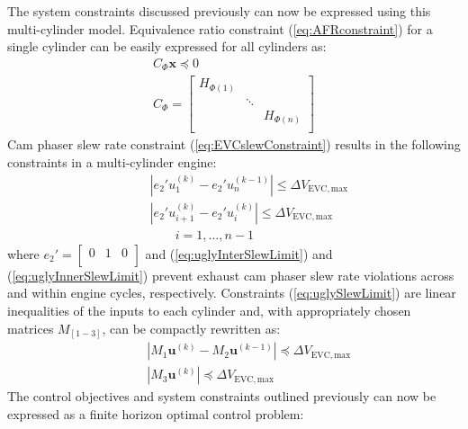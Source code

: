 The system constraints discussed previously can now be expressed using this multi-cylinder model. Equivalence ratio constraint (\ref{eq:AFRconstraint}) for a single cylinder can be easily expressed for all cylinders as:
\begin{gather}
C_{\Phi} \mathbf x \preceq 0 \\[2ex]
C_{\Phi} =
\begin{bmatrix}
H_{\Phi(1)} & &   \\
 & \ddots & \\
 & & H_{\Phi(n)} \nonumber \\
\end{bmatrix}
\end{gather}
Cam phaser slew rate constraint (\ref{eq:EVCslewConstraint}) results in the following constraints in a multi-cylinder engine:
\begin{subequations}
\label{eq:uglySlewLimit}
\begin{alignat}{2}
&&&\left|e_2' u_1^{(k)} - e_2' u_n^{(k-1)}\right| \leq \Delta V_{\mathrm{EVC,max}} \label{eq:uglyInterSlewLimit}\\
&&&\left|e_2' u_{i+1}^{(k)} - e_2' u_i^{(k)}\right| \leq \Delta V_{\mathrm{EVC,max}} \label{eq:uglyInnerSlewLimit}\\
&&& \qquad i=1,\ldots,n-1  \nonumber
\end{alignat}
\end{subequations}
where $e_2'= \left[\begin{array}{ccc}0 & 1 & 0 \\\end{array}\right]$ and (\ref{eq:uglyInterSlewLimit}) and (\ref{eq:uglyInnerSlewLimit}) prevent exhaust cam phaser slew rate violations across and within engine cycles, respectively. Constraints (\ref{eq:uglySlewLimit}) are linear inequalities of the inputs to each cylinder and, with appropriately chosen matrices $M_{[1-3]}$, can be compactly rewritten as:
\begin{subequations}
\begin{alignat}{2}
&&& \left|M_1 \mathbf{u}^{(k)} - M_2 \mathbf{u}^{(k-1)}\right| \preceq \Delta V_{\mathrm{EVC,max}}\\
&&& \left|M_3 \mathbf{u}^{(k)}\right| \preceq \Delta V_{\mathrm{EVC,max}}
\end{alignat}\label{eq:niceSlewLimit}
\end{subequations}
The control objectives and system constraints outlined previously can now be expressed as a finite horizon optimal control problem:
